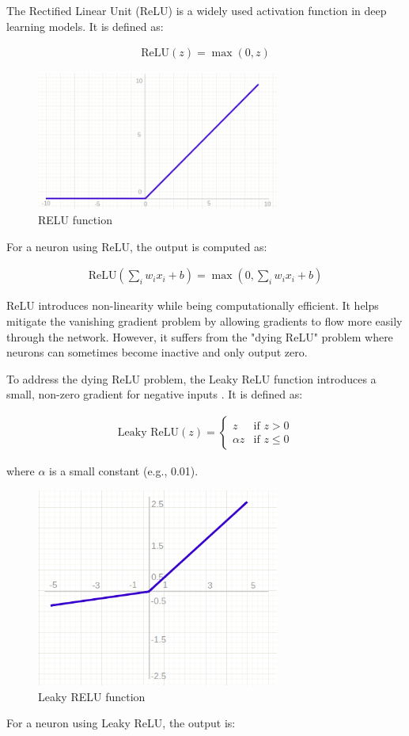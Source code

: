 The Rectified Linear Unit (ReLU) is a widely used activation function in deep learning models.
It is defined as:

\begin{align}
  \text{ReLU}(z) = \max(0, z)
\end{align}

\begin{figure}[H]
  \centering
  \includegraphics[width=80mm]{figures/relu.png}
  \caption{RELU function \cite{Potrimba_2023}}
  \label{relu}
\end{figure}

For a neuron using ReLU, the output is computed as:

\begin{align}
  \text{ReLU}(\sum_i w_i x_i + b) = \max(0, \sum_i w_i x_i + b)
\end{align}

ReLU introduces non-linearity while being computationally efficient.
It helps mitigate the vanishing gradient problem by allowing gradients to flow more easily through the network\cite{Goodfellow_2016}.
However, it suffers from the "dying ReLU" problem where neurons can sometimes become inactive and only output zero.

To address the dying ReLU problem, the Leaky ReLU function introduces a small, non-zero gradient for negative inputs \cite{Maas_Hannun_Ng_2014}.
It is defined as:

\begin{align}
  \text{Leaky ReLU}(z) = \begin{cases}
    z & \text{if } z > 0 \\
    \alpha z & \text{if } z \leq 0
  \end{cases}
\end{align}

where \( \alpha \) is a small constant (e.g., 0.01).

\begin{figure}[H]
  \centering
  \includegraphics[width=80mm]{figures/lrelu.png}
  \caption{Leaky RELU function \cite{Potrimba_2023}}
  \label{lrelu}
\end{figure}
For a neuron using Leaky ReLU, the output is:

